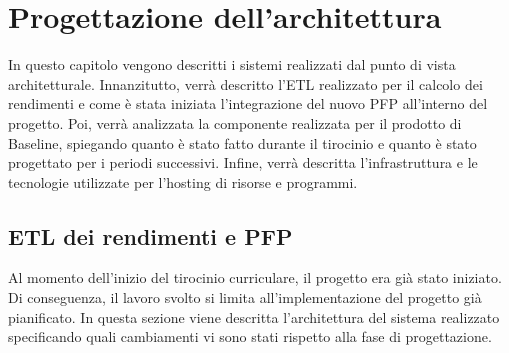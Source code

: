 \clearpage
\chapter{Progettazione dell'architettura}\label{ch:design}
In questo capitolo vengono descritti i sistemi realizzati dal punto di vista architetturale.
Innanzitutto, verrà descritto l'ETL realizzato per il calcolo dei rendimenti e come è stata iniziata l'integrazione del nuovo PFP all'interno del progetto.
Poi, verrà analizzata la componente realizzata per il prodotto di Baseline, spiegando quanto è stato fatto durante il tirocinio e quanto è stato progettato per i periodi successivi.
Infine, verrà descritta l'infrastruttura e le tecnologie utilizzate per l'hosting di risorse e programmi.

\section{ETL dei rendimenti e PFP}\label{sec:etl-architecture}
Al momento dell'inizio del tirocinio curriculare, il progetto era già stato iniziato.
Di conseguenza, il lavoro svolto si limita all'implementazione del progetto già pianificato.
In questa sezione viene descritta l'architettura del sistema realizzato specificando quali cambiamenti vi sono stati rispetto alla fase di progettazione.

